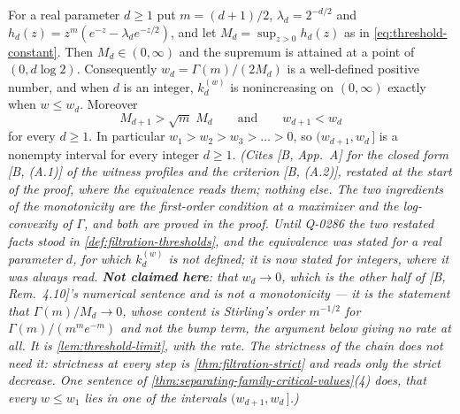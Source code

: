 \begin{lemma}
\label{lem:threshold-monotone}
\leanok
For a real parameter $d \ge 1$ put $m = (d+1)/2$, $\lambda_d = 2^{-d/2}$ and
$h_d(z) = z^m(e^{-z} - \lambda_d e^{-z/2})$, and let $M_d = \sup_{z>0}h_d(z)$ as in
\ref{eq:threshold-constant}. Then $M_d \in (0,\infty)$ and the supremum is attained at a point of
$(0,d\log 2)$. Consequently $w_d = \Gamma(m)/(2M_d)$ is a well-defined positive number, and when
$d$ is an integer, $k^{(w)}_d$ is nonincreasing on $(0,\infty)$ exactly when $w \le w_d$. Moreover
\[
  M_{d+1} > \sqrt{m}\;M_d \qquad\text{and}\qquad w_{d+1} < w_d
\]
for every $d \ge 1$. In particular $w_1 > w_2 > w_3 > \dots > 0$, so
$(w_{d+1}, w_d\,]$ is a nonempty interval for every integer $d \ge 1$.
\statusT\quad\emph{(Cites [B, App.~A] for the closed form [B, (A.1)] of the witness profiles and
the criterion [B, (A.2)], restated at the start of the proof, where the equivalence reads them;
nothing else. The two ingredients of the monotonicity are the first-order condition at a
maximizer and the log-convexity of $\Gamma$, and both are proved in the proof. Until Q-0286 the
two restated facts stood in \ref{def:filtration-thresholds}, and the equivalence was stated for a
real parameter $d$, for which $k^{(w)}_d$ is not defined; it is now stated for integers, where it
was always read. \textbf{Not
claimed here}: that $w_d \to 0$, which is the other half of [B, Rem.~4.10]'s numerical sentence and
is not a monotonicity --- it is the statement that $\Gamma(m)/M_d \to 0$, whose content is
Stirling's order $m^{-1/2}$ for $\Gamma(m)/(m^me^{-m})$ and not the bump term, the argument below
giving no rate at all. It is \ref{lem:threshold-limit}, with the rate. The strictness of the
chain does not need it: strictness at every step is \ref{thm:filtration-strict} and reads only
the strict decrease. One sentence of \ref{thm:separating-family-critical-values}(4) does, that
every $w \le w_1$ lies in one of the intervals $(w_{d+1}, w_d\,]$.)}
\end{lemma}

